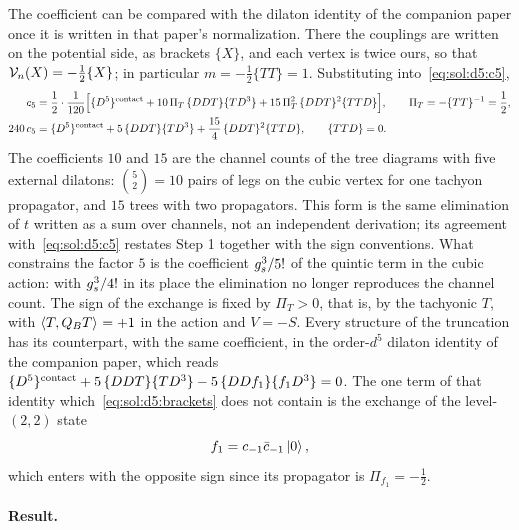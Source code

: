 The coefficient can be compared with the dilaton identity of the companion paper once it is written in that paper's normalization.
There the couplings are written on the potential side, as brackets $\{X\}$, and each vertex is twice ours, so that $\mathcal{V}_{n}(X) = - \tfrac{1}{2} \{X\}$; in particular $m = - \tfrac{1}{2} \{T T\} = 1$.
Substituting into~\eqref{eq:sol:d5:c5},
\begin{equation}
  \label{eq:sol:d5:brackets}
  \begin{aligned}
    c_5
      &
      = \frac{1}{2} \cdot \frac{1}{120} \Big[
        \{D^5\}^{\rm contact}
        + 10 \, \Pi_T \, \{D D T\} \{T D^3\}
        + 15 \, \Pi_T^2 \, \{D D T\}^2 \{T T D\}
      \Big],
      \qquad
      \Pi_T
        = - \{T T\}^{-1}
        = \frac{1}{2},
    \\
    240 \, c_5
      &
      = \{D^5\}^{\rm contact}
        + 5 \, \{D D T\} \{T D^3\}
        + \frac{15}{4} \, \{D D T\}^2 \{T T D\},
      \qquad
      \{T T D\}
        = 0.
  \end{aligned}
\end{equation}
The coefficients $10$ and $15$ are the channel counts of the tree diagrams with five external dilatons: $\binom{5}{2} = 10$ pairs of legs on the cubic vertex for one tachyon propagator, and $15$ trees with two propagators.
This form is the same elimination of $t$ written as a sum over channels, not an independent derivation; its agreement with~\eqref{eq:sol:d5:c5} restates Step 1 together with the sign conventions.
What constrains the factor $5$ is the coefficient $g_s^3 / 5!$ of the quintic term in the cubic action: with $g_s^3 / 4!$ in its place the elimination no longer reproduces the channel count.
The sign of the exchange is fixed by $\Pi_T > 0$, that is, by the tachyonic $T$, with $\braket{T, Q_B T}_{} = + 1$ in the action and $V = - S$.
Every structure of the truncation has its counterpart, with the same coefficient, in the order-$d^5$ dilaton identity of the companion paper, which reads $\{D^5\}^{\rm contact} + 5 \, \{D D T\} \{T D^3\} - 5 \, \{D D f_1\} \{f_1 D^3\} = 0$.
The one term of that identity which~\eqref{eq:sol:d5:brackets} does not contain is the exchange of the level-$(2, 2)$ state
\begin{equation}
  f_1
    = c_{-1} \bar c_{-1} \ket{0},
\end{equation}
which enters with the opposite sign since its propagator is $\Pi_{f_1} = - \tfrac{1}{2}$.

\paragraph{Result.}

